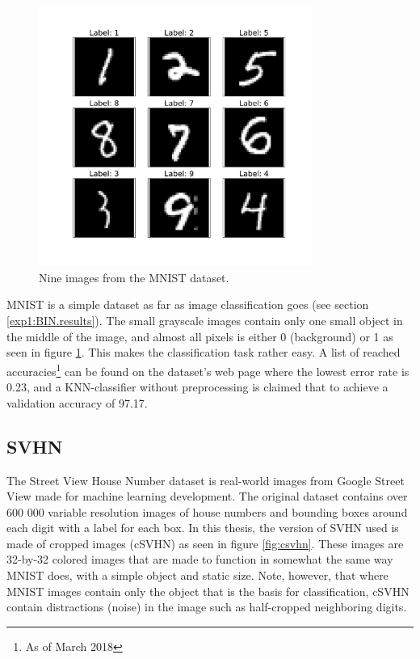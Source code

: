 \begin{figure}[p!]
    \centering
    \includegraphics[width=0.8\textwidth]{Chapters/3.Implementation/figures/MNIST.pdf}
    \caption[MNIST example]{Nine images from the MNIST dataset.}
    \label{fig:mnist}
\end{figure}

MNIST is a simple dataset as far as image classification goes (see section \ref{exp1:BIN.results}). The small grayscale images contain only one small object in the middle of the image, and almost all pixels is either 0 (background) or 1 as seen in figure \ref{fig:mnist}. This makes the classification task rather easy. A list of reached accuracies\footnote{As of March 2018} can be found on the dataset's web page\cite{mnistpage} where the lowest error rate is 0.23\cite{goodmnist}, and a KNN-classifier without preprocessing is claimed that to achieve a validation accuracy of 97.17. 


\subsection{SVHN}\label{Implementation:SVHN}
The Street View House Number\cite{SVHN} dataset is real-world images from Google Street View made for machine learning development. The original dataset contains over 600 000 variable resolution images of house numbers and bounding boxes around each digit with a label for each box. In this thesis, the version of SVHN used is made of cropped images (cSVHN) as seen in figure \ref{fig:csvhn}. These images are 32-by-32 colored images that are made to function in somewhat the same way MNIST does, with a simple object and static size. Note, however, that where MNIST images contain only the object that is the basis for classification, cSVHN contain distractions (noise) in the image such as half-cropped neighboring digits. 

